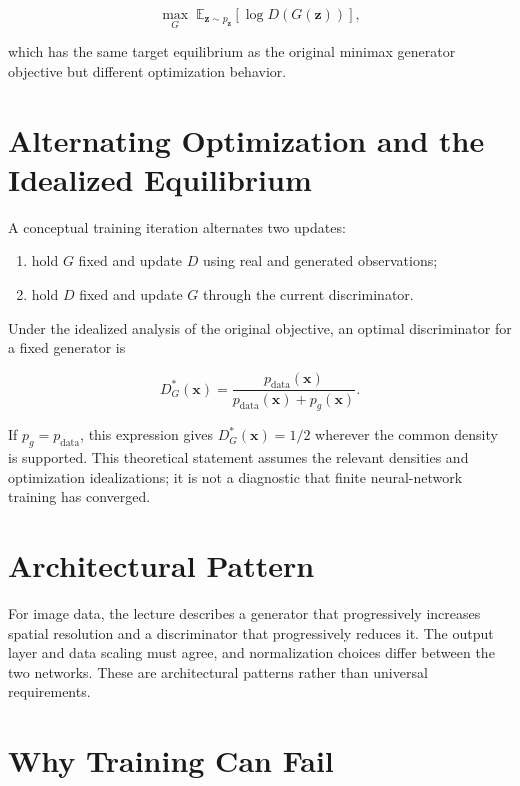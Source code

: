 \documentclass{article}
\begin{document}
\[
\max_G\;
\mathbb{E}_{\mathbf{z}\sim p_{\mathbf{z}}}
[\log D(G(\mathbf{z}))],
\]

which has the same target equilibrium as the original minimax generator objective but
different optimization behavior.

\section{Alternating Optimization and the Idealized Equilibrium}

A conceptual training iteration alternates two updates:

\begin{enumerate}
\item hold $G$ fixed and update $D$ using real and generated observations;
\item hold $D$ fixed and update $G$ through the current discriminator.
\end{enumerate}

Under the idealized analysis of the original objective, an optimal discriminator for a
fixed generator is

\[
D_G^*(\mathbf{x})
=\frac{p_{\mathrm{data}}(\mathbf{x})}
{p_{\mathrm{data}}(\mathbf{x})+p_g(\mathbf{x})}.
\]

If $p_g=p_{\mathrm{data}}$, this expression gives
$D_G^*(\mathbf{x})=1/2$ wherever the common density is supported. This theoretical
statement assumes the relevant densities and optimization idealizations; it is not a
diagnostic that finite neural-network training has converged.


\section{Architectural Pattern}

For image data, the lecture describes a generator that progressively increases spatial
resolution and a discriminator that progressively reduces it. The output layer and
data scaling must agree, and normalization choices differ between the two networks.
These are architectural patterns rather than universal requirements.


\section{Why Training Can Fail}
\end{document}

